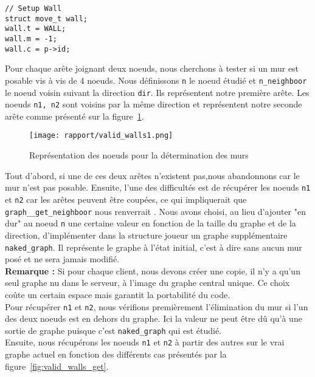\documentclass[a4paper]{article}
\begin{document}
\begin{lstlisting}[caption = {Initialisation des murs}, label = {algo:setup_wall}, float = h]
  // Setup Wall 
struct move_t wall; 
wall.t = WALL; 
wall.m = -1; 
wall.c = p->id; 
\end{lstlisting}

Pour chaque arête joignant deux noeuds, nous cherchons à tester si un mur est posable vis à vis de 4 noeuds. Nous définissons \texttt{n} le noeud étudié et \texttt{n\_neighboor} le noeud voisin suivant la direction \texttt{dir}. Ils représentent notre première arête. Les noeuds \texttt{n1, n2} sont voisins par la même direction et représentent notre seconde arête comme présenté sur la figure~\ref{fig:valid_walls1}. \\

\begin{figure}[h!]
    \centering
    \texttt{[image: rapport/valid\_walls1.png]}
    \caption{Représentation des noeuds pour la détermination des murs}
    \label{fig:valid_walls1}
\end{figure}

Tout d'abord, si une de ces deux arêtes n'existent pas,nous abandonnons car le mur n'est pas posable. Ensuite, l'une des difficultés est de récupérer les noeuds \texttt{n1} et \texttt{n2} car les arêtes peuvent être coupées, ce qui impliquerait que \texttt{graph\_\_get\_neighboor} nous renverrait . Nous avons choisi, au lieu d'ajouter "en dur" au noeud \texttt{n} une certaine valeur en fonction de la taille du graphe et de la direction, d'implémenter dans la structure joueur un graphe supplémentaire \texttt{naked\_graph}. Il représente le graphe à l'état initial, c'est à dire sans aucun mur posé et ne sera jamais modifié. \\

\textbf{Remarque :} Si pour chaque client, nous devons créer une copie, il n'y a qu'un seul graphe nu dans le serveur, à l'image du graphe central unique. Ce choix coûte un certain espace mais garantit la portabilité du code. \\

Pour récupérer \texttt{n1} et \texttt{n2}, nous vérifions premièrement l'élimination du mur si l'un des deux noeuds est en dehors du graphe. Ici la valeur  ne peut être dû qu'à une sortie de graphe puisque c'est \texttt{naked\_graph} qui est étudié. \\

Ensuite, nous récupérons les noeuds \texttt{n1} et \texttt{n2} à partir des autres sur le vrai graphe actuel en fonction des différents cas présentés par la figure~\ref{fig:valid_walls_get}.
\end{document}
